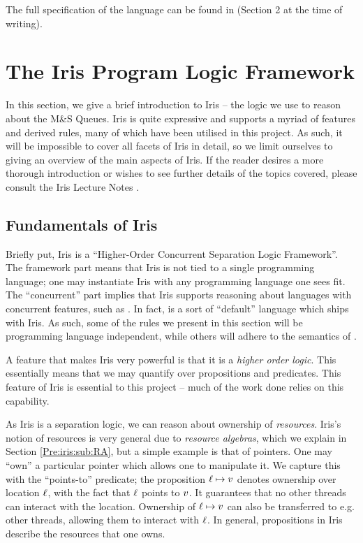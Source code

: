 \documentclass[a4paper, 10pt]{report}
\theoremstyle{definition}
\newcommand{\msq}{M\&S Queue}
\begin{document}
The full specification of the language can be found in \citet{gentleiris} (Section 2 at the time of writing).

\section{The Iris Program Logic Framework}
\label{Pre:section:iris}

In this section, we give a brief introduction to Iris -- the logic we use to reason about the \msq{}s. Iris is quite expressive and supports a myriad of features and derived rules, many of which have been utilised in this project. As such, it will be impossible to cover all facets of Iris in detail, so we limit ourselves to giving an overview of the main aspects of Iris. If the reader desires a more thorough introduction or wishes to see further details of the topics covered, please consult the Iris Lecture Notes \citep{gentleiris}.

\subsection{Fundamentals of Iris}
Briefly put, Iris is a \enquote{Higher-Order Concurrent Separation Logic Framework}. The framework part means that Iris is not tied to a single programming language; one may instantiate Iris with any programming language one sees fit. The ``concurrent'' part implies that Iris supports reasoning about languages with concurrent features, such as \heaplang. In fact, \heaplang is a sort of ``default'' language which ships with Iris. As such, some of the rules we present in this section will be programming language independent, while others will adhere to the semantics of \heaplang.

A feature that makes Iris very powerful is that it is a \textit{higher order logic}. This essentially means that we may quantify over propositions and predicates. This feature of Iris is essential to this project -- much of the work done relies on this capability.

As Iris is a separation logic, we can reason about ownership of \textit{resources}. Iris's notion of resources is very general due to \textit{resource algebras}, which we explain in Section \ref{Pre:iris:sub:RA}, but a simple example is that of pointers. One may ``own'' a particular pointer which allows one to manipulate it. We capture this with the ``points-to'' predicate; the proposition $\ell \mapsto v$ denotes ownership over location $\ell$, with the fact that $\ell$ points to $v$. It guarantees that no other threads can interact with the location. Ownership of $\ell \mapsto v$ can also be transferred to e.g. other threads, allowing them to interact with $\ell$. In general, propositions in Iris describe the resources that one owns.
\end{document}
